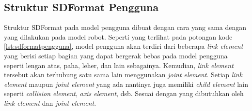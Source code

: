 \subsection{Struktur SDFormat Pengguna}
\label{subsec:sdformatpengguna}



Struktur SDFormat pada model pengguna dibuat dengan cara yang sama dengan yang dilakukan pada model robot.
Seperti yang terlihat pada potongan kode \ref{lst:sdformatpengguna},
  model pengguna akan terdiri dari beberapa \emph{link element} yang berisi setiap bagian yang dapat bergerak bebas pada model pengguna seperti lengan atas, paha, leher, dan lain sebagainya.
Kemudian, \emph{link element} tersebut akan terhubung satu sama lain menggunakan \emph{joint element}.
Setiap \emph{link element} maupun \emph{joint element} yang ada nantinya juga memiliki \emph{child element} lain seperti \emph{collision element}, \emph{axis element}, dsb. Sesuai dengan yang dibutuhkan oleh \emph{link element} dan \emph{joint element}.
